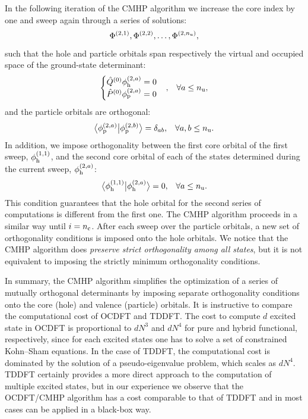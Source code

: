 \documentclass[12pt]{article}
\newcommand{\hilight}[1]{\begin{mdframed}[hidealllines=true,backgroundcolor=yellow] {#1} \end{mdframed}}
\newcommand{\braket}[3][0]
{\ifthenelse{\equal{#1}{0}}{\left\langle #2 \middle| #3 \right\rangle}
{\ifthenelse{\equal{#1}{1}}{\big\langle #2 \big| #3 \big\rangle}
{\ifthenelse{\equal{#1}{2}}{\Big\langle #2 \Big| #3 \Big\rangle}
{\ifthenelse{\equal{#1}{3}}{\bigg\langle #2 \bigg| #3 \bigg\rangle}
{\ifthenelse{\equal{#1}{4}}{\Bigg\langle #2 \Bigg| #3 \Bigg\rangle}
{Error}}}}}
}
\begin{document}
In the following iteration of the CMHP algorithm we increase the core index by one and sweep again through a series of solutions:
\begin{equation}
\Phi^{(2,1)}, \Phi^{(2,2)}, \ldots, \Phi^{(2,n_{\rm u})},
\end{equation}
such that the hole and particle orbitals span respectively the virtual and occupied space of the ground-state determinant:
\begin{align}
\begin{cases}
\hat{Q}^{(0)}\phi_{\rm h}^{(2,a)}= 0\\
\hat{P}^{(0)}\phi_{\rm p}^{(2,a)}= 0
\end{cases} &,&\forall a \leq n_{\rm u},
\end{align}
and the particle orbitals are orthogonal:
\begin{align}
\braket[1]{\phi^{(2,a)}_{\rm p}}{\phi^{(2,b)}_{\rm p}} &= \delta_{ab},&\forall a,b \leq n_{\rm u}.
\end{align}
In addition, we impose orthogonality between the first core orbital of the first sweep, $\phi^{(1,1)}_{\rm h}$, and the second core orbital of each of the states determined during the current sweep, $\phi^{(2,a)}_{\rm h}$:
\begin{align}
\braket[1]{\phi^{(1,1)}_{\rm h}}{\phi^{(2,a)}_{\rm h}} &=0,&\forall a \leq n_{\rm u}.
\end{align}
This condition guarantees that the hole orbital for the second series of computations is different from the first one.
The CMHP algorithm proceeds in a similar way until $i = n_{\rm c}$.  After each sweep over the particle orbitals, a new set of orthogonality conditions is imposed onto the hole orbitals.
We notice that the CMHP algorithm does \textit{preserve strict orthogonality among all states}, but it is not equivalent to imposing the strictly minimum orthogonality conditions.
\hilight{In summary, the CMHP algorithm simplifies the optimization of a series of mutually orthogonal determinants by imposing separate orthogonality conditions onto the core (hole) and valence (particle) orbitals.
It is instructive to compare the computational cost of OCDFT and TDDFT.
The cost to compute $d$ excited state in OCDFT is proportional to $d N^3$ and $d N^4$ for pure and hybrid functional, respectively, since for each excited states one has to solve a set of constrained Kohn--Sham equations.
In the case of TDDFT, the computational cost is dominated by the solution of a pseudo-eigenvalue problem, which scales as $d N^4$.
TDDFT certainly provides a more direct approach to the computation of multiple excited states, but in our experience we observe that the OCDFT/CMHP algorithm has a cost comparable to that of TDDFT and in most cases can be applied in a black-box way.
}
\end{document}
